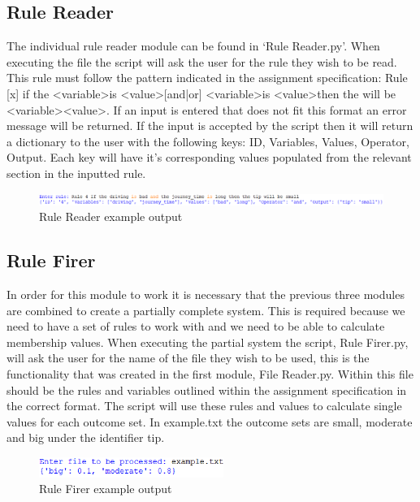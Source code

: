 \documentclass{article}
\begin{document}
\subsection{Rule Reader}
The individual rule reader module can be found in ‘Rule Reader.py’. When executing the file the script will ask the user for the rule they wish to be read. This rule must follow the pattern indicated in the assignment specification: Rule [x] if the \textless variable\textgreater is \textless value\textgreater [and|or] \textless variable\textgreater is \textless value\textgreater then the will be \textless variable\textgreater \textless value\textgreater. If an input is entered that does not fit this format an error message will be returned. If the input is accepted by the script then it will return a dictionary to the user with the following keys: ID, Variables, Values, Operator, Output. Each key will have it’s corresponding values populated from the relevant section in the inputted rule. 


\begin{figure}[H]
\includegraphics[width=12cm]{example3}
\caption{Rule Reader example output}
\end{figure}

\subsection{Rule Firer}
In order for this module to work it is necessary that the previous three modules are combined to create a partially complete system. This is required because we need to have a set of rules to work with and we need to be able to calculate membership values. When executing the partial system the script, Rule Firer.py, will ask the user for the name of the file they wish to be used, this is the functionality that was created in the first module, File Reader.py. Within this file should be the rules and variables outlined within the assignment specification in the correct format. The script will use these rules and values to calculate single values for each outcome set. In example.txt the outcome sets are small, moderate and big under the identifier tip.

\begin{figure}[H]
\centering
\includegraphics[width=6cm]{example4}
\caption{Rule Firer example output}
\end{figure}
\end{document}
